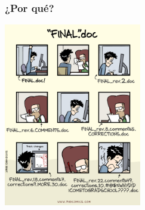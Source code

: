 \documentclass{beamer}
\title{\titulo}
\subtitle{¿Cómo usarlo?}
\author{\autor}
\date{\fecha}
\begin{document}
	
\maketitle


\begin{frame}\frametitle{¿Por qué?}
	\centering
	\includegraphics[height=8cm]{fig/phd.jpeg}
\end{frame}
\end{document}

